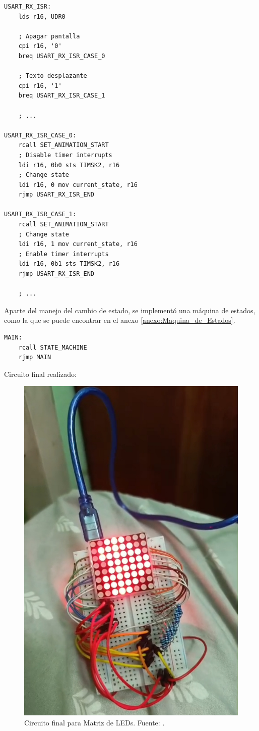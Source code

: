 \begin{verbatim}
USART_RX_ISR:	
    lds r16, UDR0

    ; Apagar pantalla
    cpi r16, '0' 
    breq USART_RX_ISR_CASE_0 

    ; Texto desplazante
    cpi r16, '1' 
    breq USART_RX_ISR_CASE_1 

    ; ...

USART_RX_ISR_CASE_0:
    rcall SET_ANIMATION_START
    ; Disable timer interrupts
    ldi r16, 0b0 sts TIMSK2, r16 
    ; Change state
    ldi r16, 0 mov current_state, r16   
    rjmp USART_RX_ISR_END

USART_RX_ISR_CASE_1:
    rcall SET_ANIMATION_START
    ; Change state
    ldi r16, 1 mov current_state, r16   
    ; Enable timer interrupts
    ldi r16, 0b1 sts TIMSK2, r16 
    rjmp USART_RX_ISR_END

    ; ...
\end{verbatim}

Aparte del manejo del cambio de estado, se implementó una máquina de estados, como la que se puede encontrar en el anexo \ref{anexo:Maquina_de_Estados}.

\begin{verbatim}
MAIN:
    rcall STATE_MACHINE
    rjmp MAIN
\end{verbatim}

Circuito final realizado:

\begin{figure}[H]
  \centering
  \includegraphics[width=0.7\linewidth]{./Anexos/Resultados/Matriz/Circuito.jpg}
  \caption{Circuito final para Matriz de LEDs. Fuente: \cite{LabDrive}.}
  \label{fig:circuito_matriz}
\end{figure}


